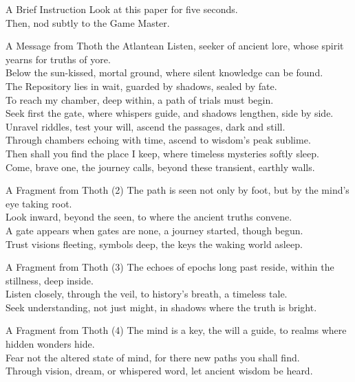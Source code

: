 \documentclass[a4paper,12pt]{article}
\begin{document}
\begin{biginfobox}{A Brief Instruction}
Look at this paper for five seconds. \\
Then, nod subtly to the Game Master.
\end{biginfobox}

\begin{biginfobox}{A Message from Thoth the Atlantean}
Listen, seeker of ancient lore, whose spirit yearns for truths of yore.\\
Below the sun-kissed, mortal ground, where silent knowledge can be found.\\
The Repository lies in wait, guarded by shadows, sealed by fate.\\
To reach my chamber, deep within, a path of trials must begin.\\
Seek first the gate, where whispers guide, and shadows lengthen, side by side.\\
Unravel riddles, test your will, ascend the passages, dark and still.\\
Through chambers echoing with time, ascend to wisdom's peak sublime.\\
Then shall you find the place I keep, where timeless mysteries softly sleep.\\
Come, brave one, the journey calls, beyond these transient, earthly walls.
\end{biginfobox}

\begin{biginfobox}{A Fragment from Thoth (2)}
The path is seen not only by foot, but by the mind's eye taking root.\\
Look inward, beyond the seen, to where the ancient truths convene.\\
A gate appears when gates are none, a journey started, though begun.\\
Trust visions fleeting, symbols deep, the keys the waking world asleep.
\end{biginfobox}

\begin{biginfobox}{A Fragment from Thoth (3)}
The echoes of epochs long past reside, within the stillness, deep inside.\\
Listen closely, through the veil, to history's breath, a timeless tale.\\
Seek understanding, not just might, in shadows where the truth is bright.
\end{biginfobox}

\begin{biginfobox}{A Fragment from Thoth (4)}
The mind is a key, the will a guide, to realms where hidden wonders hide.\\
Fear not the altered state of mind, for there new paths you shall find.\\
Through vision, dream, or whispered word, let ancient wisdom be heard.
\end{biginfobox}
\end{document}
